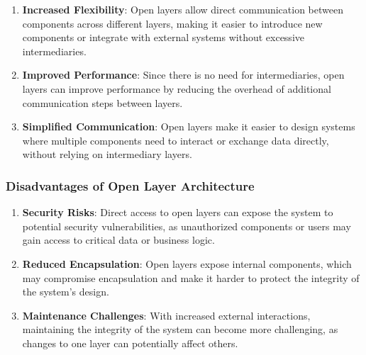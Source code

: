 \begin{enumerate}
	\item \textbf{Increased Flexibility}: Open layers allow direct communication between components across different layers, making it easier to introduce new components or integrate with external systems without excessive intermediaries.
	\item \textbf{Improved Performance}: Since there is no need for intermediaries, open layers can improve performance by reducing the overhead of additional communication steps between layers.
	\item \textbf{Simplified Communication}: Open layers make it easier to design systems where multiple components need to interact or exchange data directly, without relying on intermediary layers.
\end{enumerate}

\subsubsection{Disadvantages of Open Layer Architecture}

\begin{enumerate}
	\item \textbf{Security Risks}: Direct access to open layers can expose the system to potential security vulnerabilities, as unauthorized components or users may gain access to critical data or business logic.
	\item \textbf{Reduced Encapsulation}: Open layers expose internal components, which may compromise encapsulation and make it harder to protect the integrity of the system’s design.
	\item \textbf{Maintenance Challenges}: With increased external interactions, maintaining the integrity of the system can become more challenging, as changes to one layer can potentially affect others.
\end{enumerate}




